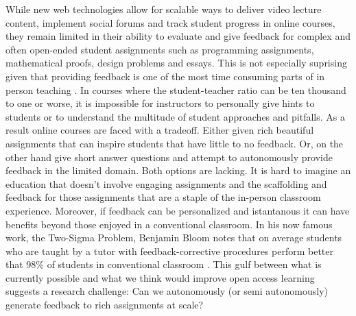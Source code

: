 While new web technologies allow for scalable ways to deliver video lecture content,
implement social forums and track student progress in online courses, they remain limited in their ability to evaluate and give
feedback for complex and often open-ended student assignments such as programming assignments, mathematical proofs, design problems and
essays. 
This is not especially suprising given that providing feedback is one of the most time consuming parts of in person teaching \cite{sadler2006impact}. In courses where the student-teacher ratio can be ten thousand to one or worse, it is impossible for instructors to personally give hints to students or to understand the multitude of student approaches and pitfalls. As a result online courses are faced with a tradeoff. Either given rich beautiful assignments that can inspire students that have little to no feedback. Or, on the other hand give short answer questions and attempt to autonomously provide feedback in the limited domain. Both options are lacking. It is hard to imagine an education that doesn't involve engaging assignments and the scaffolding and feedback for those assignments that are a staple of the in-person classroom experience. Moreover, if feedback can be personalized and istantanous it can have benefits beyond those enjoyed in a conventional classroom. In his now famous work, the Two-Sigma Problem, Benjamin Bloom notes that on average students who are taught by a tutor with feedback-corrective procedures perform better that 98\% of students in conventional classroom \cite{corbett2001cognitive}. This gulf between what is currently possible and what
we think would improve open access learning suggests a research
challenge: Can we autonomously (or semi autonomously) generate feedback to rich assignments at scale?


